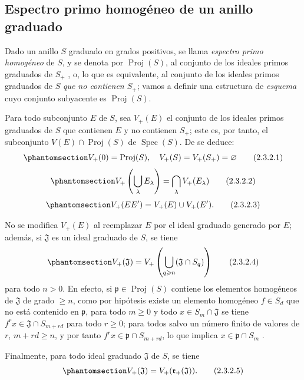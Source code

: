 \documentclass[oneside,10pt]{amsart}
\renewcommand{\geq}{\geqslant}
\newcommand{\oldpage}[2][]{\marginnote{\normalfont\footnotesize\textbf{#1}~|~#2}\ignorespaces}
\let\EGAOriginalLabel\label
\renewcommand{\label}[1]{\phantomsection\EGAOriginalLabel{#1}}
\begin{document}
\subsection{Espectro primo homogéneo de un anillo graduado}
\label{subsection:II.2.3-fr}

\begin{env}[2.3.1]
\label{II.2.3.1-fr}
Dado un anillo $S$ graduado en grados positivos, se llama \emph{espectro primo homogéneo} de $S$, y se denota por $\operatorname{Proj}(S)$, al conjunto de los ideales primos graduados de $S_+$ , o, lo que es equivalente, al conjunto de los ideales primos graduados de $S$ \emph{que no contienen $S_+$}; vamos a definir una estructura de \emph{esquema} cuyo conjunto subyacente es $\operatorname{Proj}(S)$.
\end{env}

\begin{env}[2.3.2]
\label{II.2.3.2-fr}
Para todo subconjunto $E$ de $S$, sea $V_+(E)$ el conjunto de los ideales primos graduados de $S$ que contienen $E$ y no contienen $S_+$; este es, por tanto, el subconjunto $V(E)\cap\operatorname{Proj}(S)$ de $\operatorname{Spec}(S)$.
De  se deduce:
\[
  \label{II.2.3.2.1-fr}
  V_+(0)=\operatorname{Proj}(S),\quad
  V_+(S)=V_+(S_+)=\varnothing
  \tag{2.3.2.1}
\]
\[
  \label{II.2.3.2.2-fr}
  V_+\left(\bigcup_\lambda E_\lambda\right)
  =\bigcap_\lambda V_+(E_\lambda)
  \tag{2.3.2.2}
\]
\[
  \label{II.2.3.2.3-fr}
  V_+(EE')=V_+(E)\cup V_+(E').
  \tag{2.3.2.3}
\]

No se modifica $V_+(E)$ al reemplazar $E$ por el ideal graduado generado por $E$; además, si $\mathfrak{J}$ es un ideal graduado de $S$, se tiene
\[
  \label{II.2.3.2.4-fr}
  V_+(\mathfrak{J})
  =V_+\left(\bigcup_{q\geq n}(\mathfrak{J}\cap S_q)\right)
  \tag{2.3.2.4}
\]
\oldpage[II]{26}
para todo $n>0$.
En efecto, si $\mathfrak{p}\in\operatorname{Proj}(S)$ contiene los elementos homogéneos de $\mathfrak{J}$ de grado $\geq n$, como por hipótesis existe un elemento homogéneo $f\in S_d$ que no está contenido en $\mathfrak{p}$, para todo $m\geq 0$ y todo $x\in S_m\cap\mathfrak{J}$ se tiene $f^r x\in\mathfrak{J}\cap S_{m+rd}$ para todo $r\geq0$; para todos salvo un número finito de valores de $r$, $m+rd\geq n$, y por tanto $f^r x\in\mathfrak{p}\cap S_{m+rd}$, lo que implica $x\in\mathfrak{p}\cap S_m$ .

Finalmente, para todo ideal graduado $\mathfrak{J}$ de $S$, se tiene
\[
  \label{II.2.3.2.5-fr}
  V_+(\mathfrak{J})=V_+(\mathfrak{r}_+(\mathfrak{J})).
  \tag{2.3.2.5}
\]
\end{env}
\end{document}
